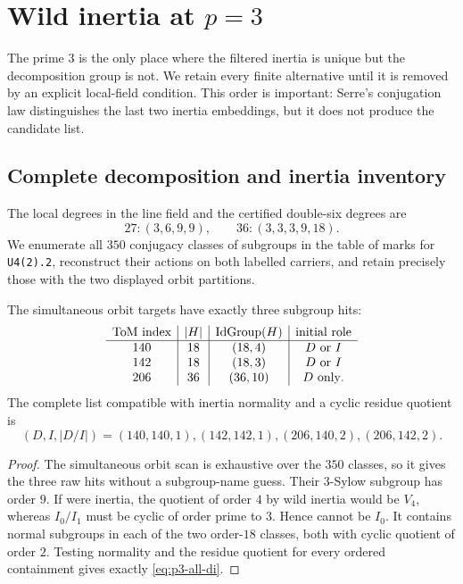 \section{\texorpdfstring{Wild inertia at \(p=3\)}{Wild inertia at p=3}}
\label{sec:wild-three}

The prime $3$ is the only place where the filtered inertia is unique but the
decomposition group is not.  We retain every finite alternative until it is
removed by an explicit local-field condition.  This order is important:
Serre's conjugation law distinguishes the last two inertia embeddings, but
it does not produce the candidate list.

\subsection{Complete decomposition and inertia inventory}

The local degrees in the line field and the certified double-six degrees are
\[
 27:(3,6,9,9),\qquad 36:(3,3,3,9,18).
\]
We enumerate all $350$ conjugacy classes of subgroups in the table of marks
for \texttt{U4(2).2}, reconstruct their actions on both labelled carriers,
and retain precisely those with the two displayed orbit partitions.

\begin{proposition}[Raw \(p=3\) hits]
\label{prop:p3-hits}
The simultaneous orbit targets have exactly three subgroup hits:
\[
\begin{array}{c|c|c|c}
\text{ToM index}&|H|&\operatorname{IdGroup}(H)&\text{initial role}\\ \hline
140&18&(18,4)&D\text{ or }I\\
142&18&(18,3)&D\text{ or }I\\
206&36&(36,10)&D\text{ only}.
\end{array}
\]
The complete list compatible with inertia normality and a cyclic residue
quotient is
\begin{equation}
(D,I,|D/I|)=(140,140,1),(142,142,1),(206,140,2),(206,142,2).
\label{eq:p3-all-di}
\end{equation}
\end{proposition}

\begin{proof}
The simultaneous orbit scan is exhaustive over the $350$ classes, so it
gives the three raw hits without a subgroup-name guess.  Their $3$-Sylow
subgroup has order $9$.  If  were inertia, the quotient of order
$4$ by wild inertia would be $V_4$, whereas $I_0/I_1$ must be cyclic of
order prime to $3$.  Hence  cannot be $I_0$.  It contains normal
subgroups in each of the two order-$18$ classes, both with cyclic quotient
of order $2$.  Testing normality and the residue quotient for every ordered
containment gives exactly \cref{eq:p3-all-di}.
\end{proof}

